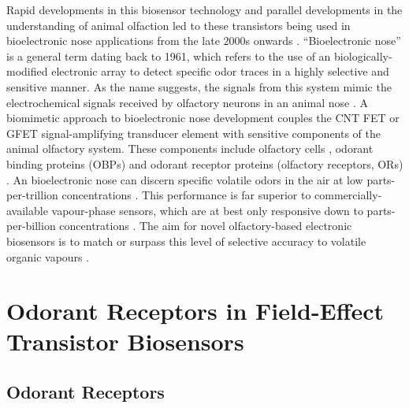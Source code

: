 \documentclass[
  a4paper,
]{scrbook}
\begin{document}
Rapid developments in this biosensor technology and parallel
developments in the understanding of animal olfaction led to these
transistors being used in bioelectronic nose applications from the late
2000s onwards \autocite{Yoon2009,Jin2012,Lee2012b,Park2012}.
``Bioelectronic nose'' is a general term dating back to 1961, which
refers to the use of an biologically-modified electronic array to detect
specific odor traces in a highly selective and sensitive manner. As the
name suggests, the signals from this system mimic the electrochemical
signals received by olfactory neurons in an animal nose
\autocite{Glatz2011,Dung2018}. A biomimetic approach to bioelectronic
nose development couples the CNT FET or GFET signal-amplifying
transducer element with sensitive components of the animal olfactory
system. These components include olfactory cells \autocite{Wang2007},
odorant binding proteins (OBPs) \autocite{Larisika2015,Kotlowski2018}
and odorant receptor proteins (olfactory receptors, ORs)
\autocite{Yang2018,Murugathas2020}. An bioelectronic nose can discern
specific volatile odors in the air at low parts-per-trillion
concentrations \autocite{Lee2010,Moon2020}. This performance is far
superior to commercially-available vapour-phase sensors, which are at
best only responsive down to parts-per-billion concentrations
\autocite{GasDetector1,GasDetector2}. The aim for novel olfactory-based
electronic biosensors is to match or surpass this level of selective
accuracy to volatile organic vapours
\autocite{Glatz2011,Kwon2015,Dung2018,Bohbot2020,Kim2022a}.

\hypertarget{sec-odorant-receptors-biosensors}{%
\section{Odorant Receptors in Field-Effect Transistor
Biosensors}\label{sec-odorant-receptors-biosensors}}

\hypertarget{sec-odorant-receptors}{%
\subsection{Odorant Receptors}\label{sec-odorant-receptors}}
\end{document}
